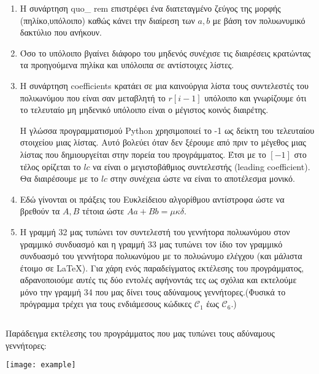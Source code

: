 \documentclass[oneside,a4paper]{article}
\newcommand {\tl}{\textlatin}
\newcommand{\C}{\mathcal{C}}
\begin{document}
\begin{enumerate}
	\item Η συνάρτηση \tl{quo\_ rem} επιστρέφει ένα διατεταγμένο ζεύγος της μορφής (πηλίκο,υπόλοιπο) καθώς κάνει την διαίρεση των $a,b$ με βάση τον πολυωνυμικό δακτύλιο που ανήκουν.
	\item Όσο το υπόλοιπο βγαίνει διάφορο του μηδενός συνέχισε τις διαιρέσεις κρατώντας τα προηγούμενα πηλίκα και υπόλοιπα σε αντίστοιχες λίστες.
	\item Η συνάρτηση \tl{coefficients} κρατάει σε μια καινούργια λίστα τους συντελεστές του πολυωνύμου που είναι σαν μεταβλητή το $r[i-1]$ υπόλοιπο και γνωρίζουμε ότι το τελευταίο μη μηδενικό υπόλοιπο είναι ο μέγιστος κοινός διαιρέτης. 

		Η γλώσσα προγραμματισμού \tl{Python} χρησιμοποιεί το -1 ως δείκτη του τελευταίου στοιχείου μιας λίστας. Αυτό βολεύει όταν δεν ξέρουμε από πριν το μέγεθος μιας λίστας που δημιουργείται στην πορεία του προγράμματος. Έτσι με το $[-1]$ στο τέλος ορίζεται το $lc$ να είναι ο μεγιστοβάθμιος συντελεστής (\tl{leading coefficient}). Θα διαιρέσουμε με το $lc$ στην συνέχεια ώστε να είναι το αποτέλεσμα μονικό.
	\item Εδώ γίνονται οι πράξεις του Ευκλείδειου αλγορίθμου αντίστροφα ώστε να βρεθούν τα $A,B$ τέτοια ώστε $Aa+Bb=μκδ$.
	\item Η γραμμή 32 μας τυπώνει τον συντελεστή του γεννήτορα πολυωνύμου στον γραμμικό συνδυασμό και η γραμμή 33 μας τυπώνει τον ίδιο τον γραμμικό συνδυασμό του γεννήτορα πολυωνύμου με το πολυώνυμο ελέγχου (και μάλιστα έτοιμο σε \LaTeX ). Για χάρη ενός παραδείγματος εκτέλεσης του προγράμματος, αδρανοποιούμε αυτές τις δύο εντολές αφήνοντάς τες ως σχόλια και εκτελούμε μόνο την γραμμή 34 που μας δίνει τους αδύναμους γεννήτορες.(Φυσικά το πρόγραμμα τρέχει για τους ενδιάμεσους κώδικες $\C_1$ έως $\C_6$.)
\end{enumerate}
$ $\newline

\indent Παράδειγμα εκτέλεσης του προγράμματος που μας τυπώνει τους αδύναμους γεννήτορες:

\texttt{[image: example]}
\end{document}
